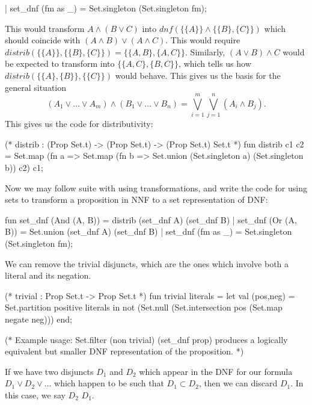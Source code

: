 \begin{node}
\begin{definition}
\begin{node}
\begin{node}
\begin{sml}
 |  set_dnf (fm as _) = Set.singleton (Set.singleton fm);
\end{sml}
This would transform $A\land(B\lor C)$ into $dnf(\{\{A\}\}\land\{\{B\},\{C\}\})$
which should coincide with $(A\land B)\lor(A\land C)$. This would require
$distrib(\{\{A\}\},\{\{B\},\{C\}\})=\{\{A,B\},\{A,C\}\}$.
Similarly, $(A\lor B)\land C$ would be expected to transform into $\{\{A,C\},\{B,C\}\}$,
which tells us how $distrib(\{\{A\},\{B\}\}, \{\{C\}\})$ would behave.
This gives us the basis for the general situation
\begin{equation}
(A_{1}\lor\dots\lor A_{m})\land(B_{1}\lor\dots\lor B_{n})
=\bigvee_{i=1}^{m}\bigvee_{j=1}^{n}(A_{i}\land B_{j}).
\end{equation}
This gives us the code for distributivity:
\begin{sml}
(* distrib : (Prop Set.t) -> (Prop Set.t) -> (Prop Set.t) Set.t *)
fun distrib c1 c2 = Set.map (fn a =>
                               Set.map (fn b => 
                                         Set.union (Set.singleton a)
                                                   (Set.singleton b))
                                       c2)
                            c1;
\end{sml}
\end{node}
\begin{node}\label{prop:normal-form-000A}%
Now we may follow suite with using transformations, and write the code
for using sets to transform a proposition in NNF to a set representation
of DNF:
\begin{sml}
fun set_dnf (And (A, B)) = distrib (set_dnf A) (set_dnf B)
 |  set_dnf (Or (A, B)) = Set.union (set_dnf A) (set_dnf B)
 |  set_dnf (fm as _) = Set.singleton (Set.singleton fm);
\end{sml}
\end{node}
\begin{node}\label{prop:normal-form-000B}%
We can remove the trivial disjuncts, which are the ones which involve
both a literal and its negation.
\begin{sml}
(* trivial : Prop Set.t -> Prop Set.t *)
fun trivial literals =
let
  val (pos,neg) = Set.partition positive literals
in
  not (Set.null (Set.intersection pos (Set.map negate neg)))
end;

(* Example usage: Set.filter (non trivial) (set_dnf prop)
   produces a logically equivalent but smaller DNF representation of the
   proposition. *)
\end{sml}
\end{node}
\begin{node}\label{prop:normal-form-000C}%
If we have two disjuncts $D_{1}$ and $D_{2}$ which appear in the DNF for
our formula $D_{1}\lor D_{2}\lor\dots$ which happen to be such that
$D_{1}\subset D_{2}$, then we can discard $D_{1}$. In this case, we say
$D_{2}$  $D_{1}$.


\end{node}
\end{node}
\end{definition}
\end{node}
